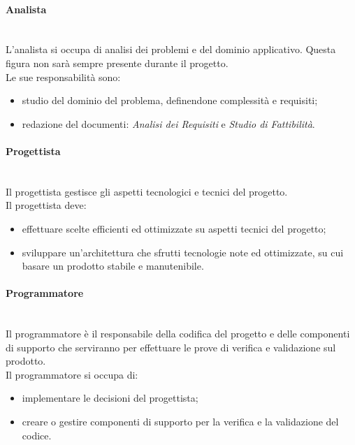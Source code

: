 			\paragraph{Analista} \mbox{}\\
			L'analista si occupa di analisi dei problemi e del dominio applicativo. Questa figura non sarà sempre presente durante il progetto. \\
			Le sue responsabilità sono:
			\begin{itemize}
				\item studio del dominio del problema, definendone complessità e requisiti;
				\item redazione del documenti: \textit{Analisi dei Requisiti} e \textit{Studio di Fattibilità}.
			\end{itemize}
			\paragraph{Progettista} \mbox{}\\
			Il progettista gestisce gli aspetti tecnologici e tecnici del progetto.\\
			Il progettista deve:
			\begin{itemize}
				\item effettuare scelte efficienti ed ottimizzate su aspetti tecnici del progetto;
				\item sviluppare un'architettura che sfrutti tecnologie note ed ottimizzate, su cui basare un prodotto stabile e manutenibile.
			\end{itemize}
			\paragraph{Programmatore} \mbox{}\\
			Il programmatore è il responsabile della codifica del progetto e delle componenti di supporto che serviranno per effettuare le prove di verifica e validazione sul prodotto.\\
			Il programmatore si occupa di:
			\begin{itemize}
				\item implementare le decisioni del progettista;
				\item creare o gestire componenti di supporto per la verifica e la validazione del codice.
			\end{itemize}

